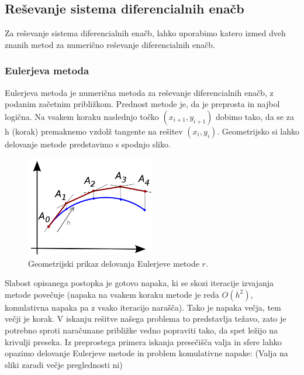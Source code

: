 \documentclass[12pt]{article}
\begin{document}
\subsection{Re\v{s}evanje sistema diferencialnih ena\v{c}b}
    Za re\v{s}evanje sistema diferencialnih ena\v{c}b, lahko uporabimo katero izmed dveh znanih metod za numeri\v{c}no re\v{s}evanje diferencialnih ena\v{c}b.
\subsubsection{Eulerjeva metoda}
    Eulerjeva metoda je numeri\v{c}na metoda za re\v{s}evanje diferencialnih ena\v{c}b, z podanim za\v{c}etnim pribli\v{z}kom. Prednost metode je, da je preprosta in najbol logi\v{c}na. Na vsakem koraku naslednjo to\v{c}ko $(x_{i+1},y_{i+1})$ dobimo tako, da se za h (korak) premaknemo vzdol\v{z} tangente na re\v{s}itev $(x_{i},y_{i})$. Geometrijsko si lahko delovanje metode predstavimo s spodnjo sliko.
    
    \begin{figure}[H]
	    \centering
    	\includegraphics[width=0.5\textwidth]{Euler_method_geom}
    	\caption{Geometrijski prikaz delovanja Eulerjeve     metode $r$.}
    	\label{slika:Euler_method_geom}
	\end{figure}

	Slabost opisanega postopka je gotovo napaka, ki se skozi iteracije izvajanja metode pove\v{c}uje (napaka na vsakem koraku metode je reda $O(h^2)$, komulativna napaka pa z vsako iteracijo nara\v{s}\v{c}a). Tako je napaka ve\v{c}ja, tem ve\v{c}ji je korak. V iskanju re\v{s}itve na\v{s}ega problema to predstavlja te\v{z}avo, zato je potrebno sproti nara\v{c}unane pribli\v{z}ke vedno popraviti tako, da spet le\v{z}ijo na krivulji preseka. 
	Iz preprostega primera iskanja presečišča valja in sfere lahko opazimo delovanje Eulerjeve metode in problem komulativne napake: (Valja na sliki zaradi ve\v{c}je preglednosti ni)
	
\end{document}
